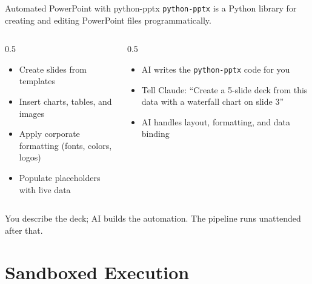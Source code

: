 \documentclass[aspectratio=169]{beamer}
\begin{document}
\begin{frame}[fragile]{Automated PowerPoint with python-pptx}
\texttt{python-pptx} is a Python library for creating and editing PowerPoint files programmatically.
\vspace{0.3cm}
\begin{columns}[T]
\begin{column}{0.5\textwidth}
\begin{shadedbox}[title=\textbf{What It Can Do}]
\begin{itemize}\small
  \item Create slides from templates
  \item Insert charts, tables, and images
  \item Apply corporate formatting (fonts, colors, logos)
  \item Populate placeholders with live data
\end{itemize}
\end{shadedbox}
\end{column}
\begin{column}{0.5\textwidth}
\begin{shadedbox}[title=\textbf{The AI Advantage}]
\begin{itemize}\small
  \item AI writes the \texttt{python-pptx} code for you
  \item Tell Claude: ``Create a 5-slide deck from this data with a waterfall chart on slide 3''
  \item AI handles layout, formatting, and data binding
\end{itemize}
\end{shadedbox}
\end{column}
\end{columns}
\vspace{0.3cm}
\alert{You describe the deck; AI builds the automation.}  The pipeline runs unattended after that.
\end{frame}

\section{Sandboxed Execution}
\end{document}

